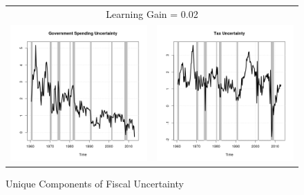 \documentclass[11pt]{article}
\begin{document}
\begin{figure}\caption{Unique Components of Fiscal Uncertainty}\label{fg:fpuremove0.02}
\begin{center}
\begin{tabular}{cc}
\multicolumn{2}{c}{Learning Gain = 0.02} \\ [0.5pc]
\includegraphics[scale=0.45]{./results/pics0.02/fpucoin_gov.png} & \includegraphics[scale=0.45]{./results/pics0.02/fpucoin_tax.png} \\

\end{tabular}
\end{center}
\end{figure}
\end{document}

